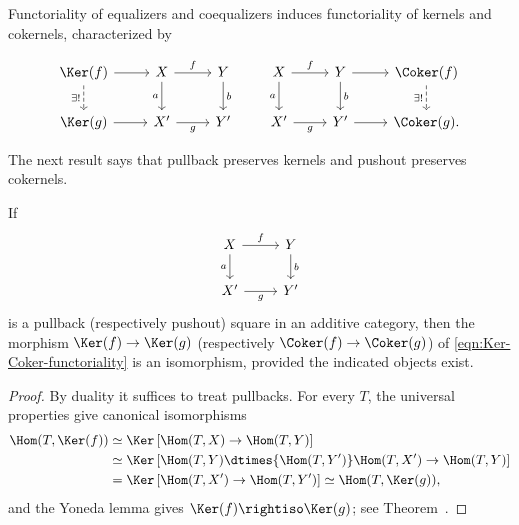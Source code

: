 Functoriality of equalizers and coequalizers induces functoriality of kernels and cokernels, characterized by

\begin{equation}\label{eqn:Ker-Coker-functoriality}\begin{tikzcd}
		\Ker(f) \arrow[r] \arrow[dashrightarrow, d, "\exists!"'] & X \arrow[d, "a"'] \arrow[r, "f"] & Y \arrow[d, "b"] \\
		\Ker(g) \arrow[r] & X' \arrow[r, "g"'] & Y'
	\end{tikzcd} \qquad \begin{tikzcd}
		X \arrow[d, "a"'] \arrow[r, "f"] & Y \arrow[d, "b"] \arrow[r] & \Coker(f) \arrow[dashrightarrow, d, "\exists!"'] \\
		X' \arrow[r, "g"'] & Y' \arrow[r] & \Coker(g) .
\end{tikzcd}\end{equation}

The next result says that pullback preserves kernels and pushout preserves cokernels.

\begin{proposition}\label{prop:pull-back-ker}
	If
	\[\begin{tikzcd}
		X \arrow[r, "f"] \arrow[d, "a"'] & Y \arrow[d, "b"] \\
		X' \arrow[r, "g"'] & Y'
	\end{tikzcd}\]
	is a pullback (respectively pushout) square in an additive category, then the morphism $\Ker(f)\to\Ker(g)$ (respectively $\Coker(f)\to\Coker(g)$) of \eqref{eqn:Ker-Coker-functoriality} is an isomorphism, provided the indicated objects exist.
\end{proposition}

\begin{proof}
	By duality it suffices to treat pullbacks. For every $T$, the universal properties give canonical isomorphisms
	\begin{align*}
		\Hom(T, \Ker(f)) & \simeq \Ker\left[ \Hom(T, X) \to \Hom(T, Y) \right] \\
		& \simeq \Ker\left[ \Hom(T, Y) \dtimes{\Hom(T, Y')} \Hom(T, X') \to \Hom(T, Y) \right] \\
		& = \Ker\left[ \Hom(T, X') \to \Hom(T, Y') \right] \simeq \Hom(T, \Ker(g)),
	\end{align*}
	and the Yoneda lemma gives $\Ker(f)\rightiso\Ker(g)$; see
	Theorem~.
\end{proof}

